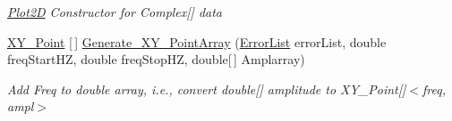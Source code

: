 \begin{DoxyCompactItemize}
\begin{DoxyCompactList}\small\item\em \mbox{\hyperlink{class_c_s_i_1_1_library_1_1_plotting_lib_1_1_plot2_d}{Plot2D}} Constructor for Complex\mbox{[}\mbox{]} data \end{DoxyCompactList}\item 
\mbox{\hyperlink{struct_c_s_i_1_1_library_1_1_data_types_1_1_x_y___point}{X\+Y\+\_\+\+Point}} \mbox{[}$\,$\mbox{]} \mbox{\hyperlink{class_c_s_i_1_1_library_1_1_plotting_lib_1_1_plot2_d_a7736899c69b8c63ff36585742c76a84a}{Generate\+\_\+\+X\+Y\+\_\+\+Point\+Array}} (\mbox{\hyperlink{class_c_s_i_1_1_library_1_1_errors_1_1_error_list}{Error\+List}} error\+List, double freq\+Start\+HZ, double freq\+Stop\+HZ, double\mbox{[}$\,$\mbox{]} Amplarray)
\begin{DoxyCompactList}\small\item\em Add Freq to double array, i.\+e., convert double\mbox{[}\mbox{]} amplitude to X\+Y\+\_\+\+Point\mbox{[}\mbox{]}$<$freq, ampl$>$ \end{DoxyCompactList}\end{DoxyCompactItemize}
